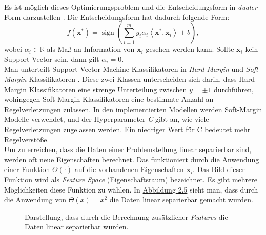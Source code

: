 Es ist m\"oglich dieses Optimierungsproblem und die Entscheidungsform in \textit{dualer} Form darzustellen \cite[Seite 168]{handson}. Die Entscheidungsform hat dadurch folgende Form:
$$ f(\mathbf{x^*}) = \operatorname{sign}(\sum_{i=1}^m y_i\alpha_i \left\langle \mathbf{x^*}, \mathbf{x}_i \right\rangle + b), $$
wobei $\alpha_i \in \mathbb{R}$ als Ma{\ss} an Information von $\mathbf{x}_i$ gesehen werden kann. Sollte $\mathbf{x}_i$ kein Support Vector sein, dann gilt $\alpha_i = 0$.\\

Man unterteilt Support Vector Machine Klassifikatoren in \textit{Hard-Margin} und \textit{Soft-Margin} Klassifikatoren \cite[Kapitel 15]{shalev}. Diese zwei Klassen 
unterscheiden sich darin, dass Hard-Margin Klassifikatoren eine strenge Unterteilung zwischen $y = \pm1$ durchf\"uhren, wohingegen Soft-Margin 
Klassifikatoren eine bestimmte Anzahl an Regelverletzungen zulassen. In den implementierten Modellen werden Soft-Margin Modelle verwendet, und der 
Hyperparameter \textit{C} gibt an, wie viele Regelverletzungen zugelassen werden. Ein niedriger Wert f\"ur C bedeutet mehr Regelverst\"o{\ss}e.  \\

Um zu erreichen, dass die Daten einer Problemstellung linear separierbar sind, werden oft neue Eigenschaften berechnet. Das funktioniert durch die 
Anwendung einer Funktion $\Theta(\cdot)$ auf die vorhandenen Eigenschaften $\mathbf{x}_i$. Das Bild dieser Funktion wird als \textit{Feature Space} (Eigenschaftsraum) bezeichnet.
Es gibt mehrere M\"oglichkeiten diese Funktion zu w\"ahlen. In 
\hyperref[fig:svm2]{Abbildung 2.5} sieht man, dass durch die Anwendung von $\Theta(x) = x^2$ die Daten linear separierbar gemacht wurden. \\

\begin{figure}[ht]
  \label{fig:svm2}
  \begin{center}
    \begin{tiny}
    \end{tiny}
  \end{center}
  \caption[Berechnung zus\"atzlicher Features aus vorhandenen Inputs]
    {Darstellung, dass durch die Berechnung zus\"atzlicher \textit{Features} die Daten linear separierbar wurden.}
\end{figure}

